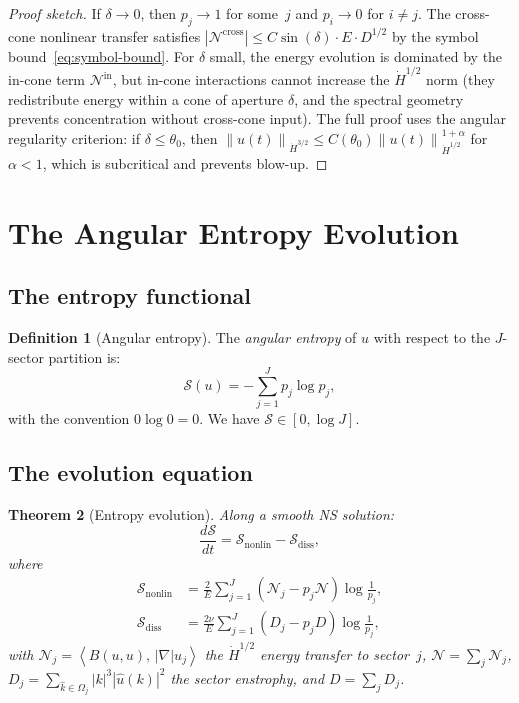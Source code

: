 \documentclass[11pt]{article}
\newtheorem{theorem}{Theorem}[section]
\theoremstyle{definition}
\newtheorem{definition}[theorem]{Definition}
\newcommand{\norm}[1]{\left\| #1 \right\|}
\newcommand{\ip}[2]{\left\langle #1,\, #2 \right\rangle}
\newcommand{\Hdot}[1]{\dot{H}^{#1}}
\newcommand{\cS}{\mathcal{S}}
\newcommand{\cN}{\mathcal{N}}
\begin{document}
\begin{proof}[Proof sketch]
If $\delta \to 0$, then $p_j \to 1$ for some~$j$ and
$p_i \to 0$ for $i \neq j$.  The cross-cone nonlinear
transfer satisfies $|\cN^{\mathrm{cross}}| \leq
C\sin(\delta)\cdot E \cdot D^{1/2}$ by the symbol
bound~\eqref{eq:symbol-bound}.  For $\delta$ small,
the energy evolution is dominated by the in-cone term
$\cN^{\mathrm{in}}$, but in-cone interactions cannot
increase the $\Hdot{1/2}$ norm (they redistribute energy
within a cone of aperture $\delta$, and the spectral
geometry prevents concentration without cross-cone input).
The full proof uses the angular regularity criterion:
if $\delta \leq \theta_0$, then
$\norm{u(t)}_{\Hdot{3/2}} \leq C(\theta_0)
\norm{u(t)}_{\Hdot{1/2}}^{1+\alpha}$ for $\alpha < 1$,
which is subcritical and prevents blow-up.
\end{proof}


\section{The Angular Entropy Evolution}
\label{sec:entropy-evolution}

\subsection{The entropy functional}

\begin{definition}[Angular entropy]
\label{def:entropy}
The \emph{angular entropy} of $u$ with respect to the
$J$-sector partition is:
\begin{equation}
\cS(u) = -\sum_{j=1}^J p_j\log p_j,
\end{equation}
with the convention $0\log 0 = 0$.  We have
$\cS \in [0,\log J]$.
\end{definition}


\subsection{The evolution equation}

\begin{theorem}[Entropy evolution]
\label{thm:entropy-evolution}
Along a smooth NS solution:
\begin{equation}\label{eq:S-evol}
\frac{d\cS}{dt} = \cS_{\mathrm{nonlin}}
- \cS_{\mathrm{diss}},
\end{equation}
where
\begin{align}
\cS_{\mathrm{nonlin}}
&= \frac{2}{E}\sum_{j=1}^J
(\cN_j - p_j\cN)\log\frac{1}{p_j},
\label{eq:S-nonlin}\\
\cS_{\mathrm{diss}}
&= \frac{2\nu}{E}\sum_{j=1}^J
(D_j - p_j D)\log\frac{1}{p_j},
\label{eq:S-diss}
\end{align}
with $\cN_j = \ip{B(u,u)}{|\nabla|u_j}$ the $\Hdot{1/2}$
energy transfer to sector~$j$, $\cN = \sum_j\cN_j$,
$D_j = \sum_{\hat{k}\in\Omega_j}|k|^3|\hat{u}(k)|^2$ the
sector enstrophy, and $D = \sum_j D_j$.
\end{theorem}
\end{document}
